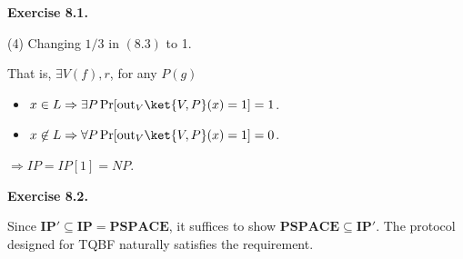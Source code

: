 \documentclass[a4paper]{article}
\newenvironment{exercise}[1]{
	\par
	\noindent\textbf{Exercise #1.}\quad
}{
	\par
	\bigskip
}
\begin{document}
\begin{exercise}{8.1}
(4) Changing $1/3$ in $(8.3)$ to 1.

That is, $\exists V (f), r$, for any $P (g)$
\begin{itemize}
\item $x \in L \Rightarrow \exists P\Pr[\text{out}_{V}\ket{V,P}(x) = 1] = 1$. 
\item $x \not\in L \Rightarrow \forall P \Pr[\text{out}_{V}\ket{V,P}(x) = 1]  =0$.  
\end{itemize}
$\Rightarrow IP = IP[1] = NP$.
\end{exercise}

\begin{exercise}{8.2}
    Since $\textbf{IP}'\subseteq\textbf{IP}=\textbf{PSPACE}$, it suffices to show $\textbf{PSPACE}\subseteq\textbf{IP}'$.
    The protocol designed for TQBF naturally satisfies the requirement.
\end{exercise}
\end{document}
